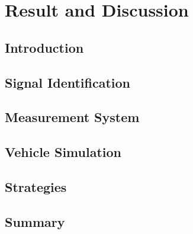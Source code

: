 \chapter{Result and Discussion}

\section{Introduction}

\section{Signal Identification}

\section{Measurement System}

\section{Vehicle Simulation}

\section{Strategies}

\section{Summary}
